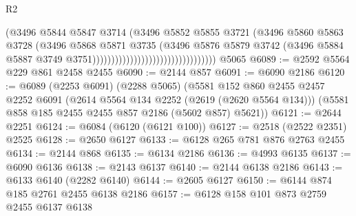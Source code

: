 \begin{lexlean}{R2}
\begin{coremodule}
                                                          (@3496
                                                            @5844
                                                            @5847
                                                            @3714
                                                            (@3496
                                                              @5852
                                                              @5855
                                                              @3721
                                                              (@3496
                                                                @5860
                                                                @5863
                                                                @3728
                                                                (@3496
                                                                  @5868
                                                                  @5871
                                                                  @3735
                                                                  (@3496
                                                                    @5876
                                                                    @5879
                                                                    @3742
                                                                    (@3496
                                                                      @5884
                                                                      @5887
                                                                      @3749
                                                                      @3751)))))))))))))))))))))))))))))))))
    @5065
@6089 := @2592 @5564 @229 @861 @2458 @2455
@6090 := @2144 @857
@6091 := @6090 @2186
@6120 := @6089
    (@2253 @6091)
    (@2288 @5065)
    (@5581
      @152
      @860
      @2455
      @2457
      @2252
      @6091
      (@2614 @5564 @134 @2252 (@2619 (@2620 @5564 @134)))
      (@5581 @858 @185 @2455 @2455 @857 @2186 (@5602 @857) @5621))
@6121 := @2644 @2251
@6124 := @6084 (@6120 (@6121 @100))
@6127 := @2518 (@2522 @2351) @2525
@6128 := @2650 @6127
@6133 := @6128 @265 @781 @876 @2763 @2455
@6134 := @2144 @868
@6135 := @6134 @2186
@6136 := @4993 @6135
@6137 := @6090 @6136
@6138 := @2143 @6137
@6140 := @2144 @6138 @2186
@6143 := @6133 @6140 (@2282 @6140)
@6144 := @2605 @6127
@6150 := @6144 @874 @185 @2761 @2455 @6138 @2186
@6157 := @6128 @158 @101 @873 @2759 @2455 @6137 @6138

\end{coremodule}
\end{lexlean}
